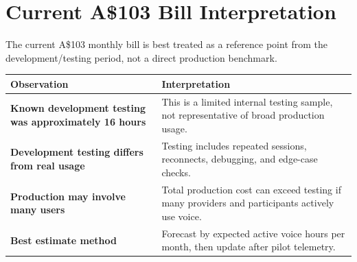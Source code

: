\documentclass[11pt,a4paper]{article}
\begin{document}
\vspace{3mm}

\begin{center}
\end{center}

\section*{Current A\$103 Bill Interpretation}

The current A\$103 monthly bill is best treated as a reference point from the development/testing period, not a direct production benchmark.

\begin{center}
\begin{tabularx}{0.94\textwidth}{>{\bfseries}l X}
\toprule
Observation & Interpretation \\
\midrule
Known development testing was approximately 16 hours & This is a limited internal testing sample, not representative of broad production usage. \\
Development testing differs from real usage & Testing includes repeated sessions, reconnects, debugging, and edge-case checks. \\
Production may involve many users & Total production cost can exceed testing if many providers and participants actively use voice. \\
Best estimate method & Forecast by expected active voice hours per month, then update after pilot telemetry. \\
\bottomrule
\end{tabularx}
\end{center}
\end{document}
